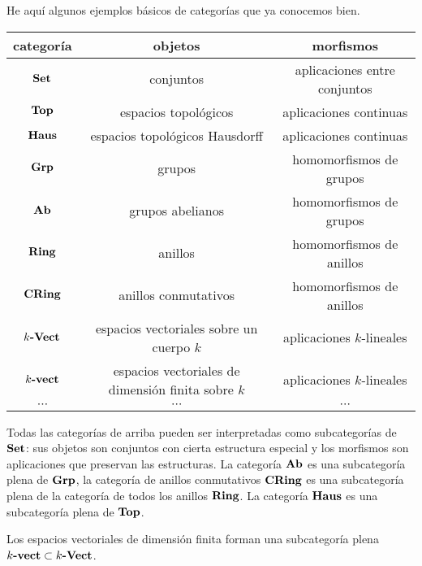 \documentclass{article}
\numberwithin{equation}{section}
\theoremstyle{definition}
\begin{document}
\begin{ejemplo}
  He aquí algunos ejemplos básicos de categorías que ya conocemos bien.

  \begin{center}
    \begin{tabular}{ccc}
      categoría & objetos & morfismos \\
      \hline
      $\text{\bf Set}$ & conjuntos & aplicaciones entre conjuntos \\
      $\text{\bf Top}$ & espacios topológicos & aplicaciones continuas \\
      $\text{\bf Haus}$ & espacios topológicos Hausdorff & aplicaciones continuas \\
      $\text{\bf Grp}$ & grupos & homomorfismos de grupos \\
      $\text{\bf Ab}$ & grupos abelianos & homomorfismos de grupos \\
      $\text{\bf Ring}$ & anillos & homomorfismos de anillos \\
      $\text{\bf CRing}$ & anillos conmutativos & homomorfismos de anillos \\
      $k\text{\bf -Vect}$ & espacios vectoriales sobre un cuerpo $k$ & aplicaciones $k$-lineales \\
      $k\text{\bf -vect}$ & espacios vectoriales de dimensión finita sobre $k$ & aplicaciones $k$-lineales \\
      $\cdots$ & $\cdots$ & $\cdots$ \\
    \end{tabular}
  \end{center}

  Todas las categorías de arriba pueden ser interpretadas como subcategorías de
  $\text{\bf Set}$: sus objetos son conjuntos con cierta estructura especial y los
  morfismos son aplicaciones que preservan las estructuras. La categoría
  $\text{\bf Ab}$ es una subcategoría plena de $\text{\bf Grp}$, la categoría de
  anillos conmutativos $\text{\bf CRing}$ es una subcategoría plena de la categoría
  de todos los anillos $\text{\bf Ring}$. La categoría $\text{\bf Haus}$ es una
  subcategoría plena de $\text{\bf Top}$.

  Los espacios vectoriales de dimensión finita forman una subcategoría plena
  $k\text{\bf -vect}\subset k\text{\bf -Vect}$.
\end{ejemplo}
\end{document}
